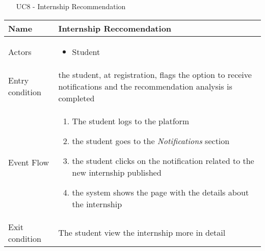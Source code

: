 				
					
				
				\begin{table} [H]
					\centering
					\begin{itemize}
						\item [UC8] - Internship Recommendation
					\end{itemize}
					\begin{tabular}{|| P{7.5cm} | P{7.5cm} ||}
						\hline
						Name & Internship Reccomendation \\
						\hline
						Actors & \parbox{5cm}{\begin{itemize}
								\item Student
							\end{itemize}
						} \\
						\hline
						Entry condition & the student, at registration, flags the 
						option to receive notifications and the recommendation analysis is completed\\
						\hline
						Event Flow & \parbox{5cm}{\begin{enumerate}
								\item The student logs to the platform  
								\item the student goes to the \textit{Notifications} 
								section
								\item  the student clicks on the notification 
								related to the new internship 
								published
								\item the system shows the page with the 
								details about the internship  
						\end{enumerate}} \\
						\hline 
						Exit condition & The student view the internship more in 
						detail \\
						\hline
					\end{tabular}
				\end{table}
				
